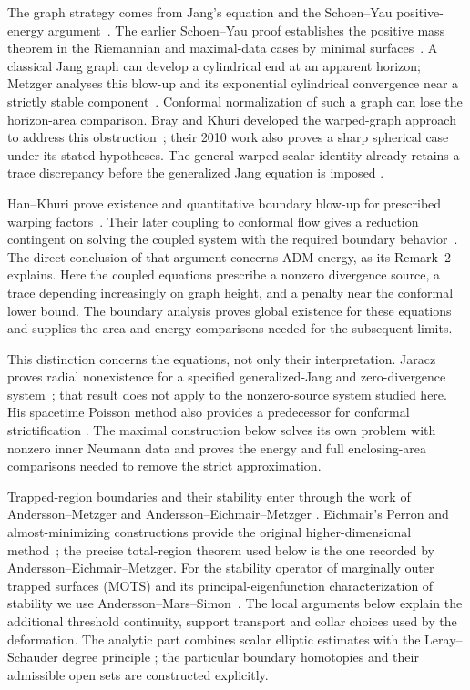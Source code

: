 The graph strategy comes from Jang's equation and the Schoen--Yau
positive-energy argument~\cite{Jang1978,SchoenYau1981}. The earlier
Schoen--Yau proof establishes the positive mass theorem in the Riemannian
and maximal-data cases by minimal surfaces~\cite{SchoenYau1979}.  A classical Jang graph can develop
a cylindrical end at an apparent horizon; Metzger analyses this blow-up
and its exponential cylindrical convergence near a strictly stable
component~\cite{Metzger2010}.
Conformal normalization of such a graph can lose the horizon-area
comparison.  Bray and Khuri developed the warped-graph approach to
address this obstruction~\cite{BrayKhuri2010,BrayKhuri2011}; their 2010
work also proves a sharp spherical case under its stated hypotheses.
The general warped scalar identity already retains a trace discrepancy
before the generalized Jang equation is imposed
\cite[Identity~9, p.~580]{BrayKhuri2011}.

Han--Khuri prove existence and quantitative boundary blow-up for
prescribed warping factors~\cite{HanKhuri2013}.  Their later coupling
to conformal flow gives a reduction contingent on solving the coupled
system with the required boundary behavior~\cite{HanKhuri2018}.
The direct conclusion of that argument concerns ADM energy, as its
Remark~2 explains.  Here the coupled equations prescribe a nonzero
divergence source, a trace depending increasingly on graph height, and
a penalty near the conformal lower bound.  The boundary analysis proves
global existence for these equations and supplies the area and energy
comparisons needed for the subsequent limits.

This distinction concerns the equations, not only their interpretation.
Jaracz proves radial nonexistence for a specified generalized-Jang and
zero-divergence system~\cite{Jaracz2023}; that result does not apply to
the nonzero-source system studied here. His spacetime Poisson method
also provides a predecessor for conformal strictification
\cite{Jaracz2025StrictDEC}. The maximal construction below solves its
own problem with nonzero inner Neumann data and proves the energy and
full enclosing-area comparisons needed to remove the strict
approximation.

Trapped-region boundaries and their stability enter through the work of
Andersson--Metzger and Andersson--Eichmair--Metzger
\cite{AnderssonMetzger2009,AnderssonEichmairMetzger2011}.
Eichmair's Perron and almost-minimizing constructions provide the
original higher-dimensional method~\cite{Eichmair2010}; the precise
total-region theorem used below is the one recorded by
Andersson--Eichmair--Metzger.  For the stability operator of marginally
outer trapped surfaces (MOTS) and its principal-eigenfunction
characterization of stability we use
Andersson--Mars--Simon~\cite{AnderssonMarsSimon2008}.  The local arguments
below explain the additional threshold continuity, support transport
and collar choices used by the deformation.  The analytic part combines
scalar elliptic estimates with the Leray--Schauder degree principle
\cite{LeraySchauder1934}; the particular boundary homotopies and their
admissible open sets are constructed explicitly.

